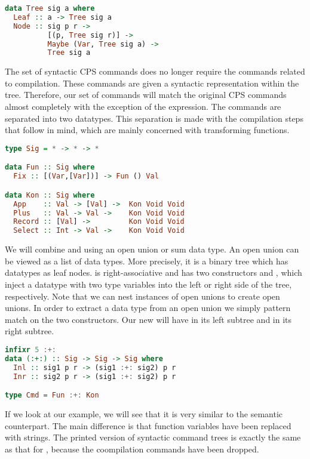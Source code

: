 \begin{lstlisting}[language=Haskell]
data Tree sig a where
  Leaf :: a -> Tree sig a
  Node :: sig p r ->
          [(p, Tree sig r)] ->
          Maybe (Var, Tree sig a) ->
          Tree sig a
\end{lstlisting}

The set of syntactic \ac{CPS} commands does no longer require the commands related to compilation. These commands are given a syntactic representation within the tree. Therefore, our set of commands will match the original \ac{CPS} commands almost completely with the exception of the  expression. The commands are separated into two datatypes. This separation is made with the compilation steps that follow in mind, which are mainly concerned with transforming functions.

\begin{lstlisting}[language=Haskell]
type Sig = * -> * -> *

data Fun :: Sig where
  Fix :: [(Var,[Var])] -> Fun () Val

data Kon :: Sig where
  App    :: Val -> [Val] ->  Kon Void Void
  Plus   :: Val -> Val ->    Kon Void Void
  Record :: [Val] ->         Kon Void Void
  Select :: Int -> Val ->    Kon Void Void
\end{lstlisting}

We will combine  and  using an open union or sum data type. An open union can be viewed as a list of data types. More precisely, it is a binary tree which has datatypes as leaf nodes. \icode{:+:} is right-associative and has two constructors  and , which inject a datatype with two type variables into the left or right side of the tree, respectively. Note that we can nest instances of open unions to create open unions. In order to extract a data type from an open union we simply pattern match on the two constructors. Our new  will have  in its left subtree and  in its right subtree.

\begin{lstlisting}[language=Haskell]
infixr 5 :+:
data (:+:) :: Sig -> Sig -> Sig where
  Inl :: sig1 p r -> (sig1 :+: sig2) p r
  Inr :: sig2 p r -> (sig1 :+: sig2) p r

type Cmd = Fun :+: Kon
\end{lstlisting}

If we look at our example, we will see that it is very similar to the semantic counterpart. The main difference is that function variables have been replaced with strings. The printed version of syntactic command trees is exactly the same as that for , because the coompilation commands have been dropped.

